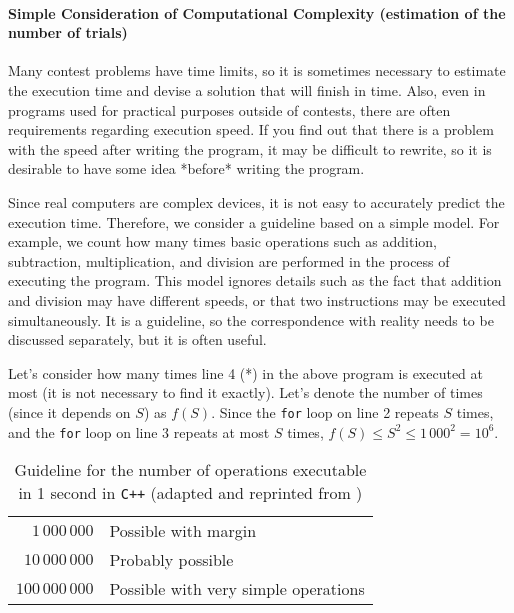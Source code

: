 \paragraph{Simple Consideration of Computational Complexity (estimation of the number of trials)}
Many contest problems have time limits, so it is sometimes necessary to estimate the execution time and devise a solution that will finish in time. Also, even in programs used for practical purposes outside of contests, there are often requirements regarding execution speed. If you find out that there is a problem with the speed after writing the program, it may be difficult to rewrite, so it is desirable to have some idea *before* writing the program.

Since real computers are complex devices, it is not easy to accurately predict the execution time. Therefore, we consider a guideline based on a simple model.
For example, we count how many times basic operations such as addition, subtraction, multiplication, and division are performed in the process of executing the program. This model ignores details such as the fact that addition and division may have different speeds, or that two instructions may be executed simultaneously. It is a guideline, so the correspondence with reality needs to be discussed separately, but it is often useful.

Let's consider how many times line 4 (*) in the above program is executed at most (it is not necessary to find it exactly).
Let's denote the number of times (since it depends on $S$) as $f(S)$. Since the \texttt{for} loop on line 2 repeats $S$ times, and the \texttt{for} loop on line 3 repeats at most $S$ times, $f(S) \le S^2 \le 1\,000^2=10^6$.

\begin{table}[h]
  \centering
  \caption{Guideline for the number of operations executable in 1 second in \texttt{C++} (adapted and reprinted from \cite{book:pcc})}
  \label{table:empirical-estimation}
  \begin{tabular}{rl}\hline
    $1\,000\,000$  &Possible with margin\\
    $10\,000\,000$ &Probably possible\\
    $100\,000\,000$&Possible with very simple operations\\\hline
  \end{tabular}
\end{table}

